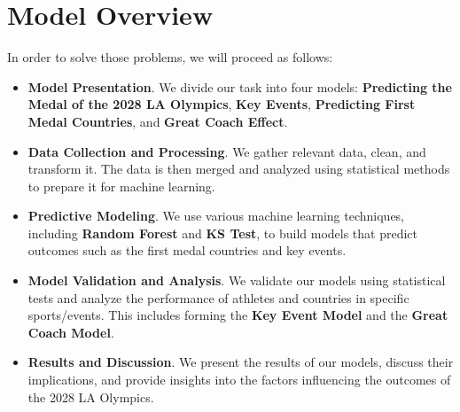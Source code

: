 \section*{Model Overview}


In order to solve those problems, we will proceed as follows:

\begin{itemize}
    \begin{figure}[htbp]
        \centering
        \texttt{[image: ./figures/figure1\_work\_flow.png]}
        \caption{Flow chart}
        \label{fig:flow_chart}
    \end{figure}
    
\item {\bf Model Presentation}. We divide our task into four models: \textbf{Predicting the Medal of the 2028 LA Olympics}, \textbf{Key Events}, \textbf{Predicting First Medal Countries}, and \textbf{Great Coach Effect}.

\item {\bf Data Collection and Processing}. We gather relevant data, clean, and transform it. The data is then merged and analyzed using statistical methods to prepare it for machine learning.

\item {\bf Predictive Modeling}. We use various machine learning techniques, including \textbf{Random Forest} and \textbf{KS Test}, to build models that predict outcomes such as the first medal countries and key events.

\item {\bf Model Validation and Analysis}. We validate our models using statistical tests and analyze the performance of athletes and countries in specific sports/events. This includes forming the \textbf{Key Event Model} and the \textbf{Great Coach Model}.

\item {\bf Results and Discussion}. We present the results of our models, discuss their implications, and provide insights into the factors influencing the outcomes of the 2028 LA Olympics.
\end{itemize}
